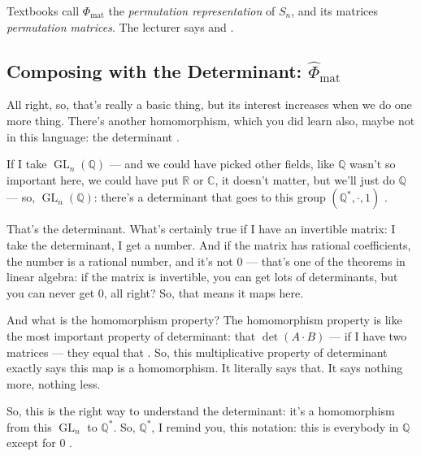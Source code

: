 \begin{aiNote}
Textbooks call $\Phi_{\mathrm{mat}}$ the \emph{permutation representation} of $S_n$, and its matrices \emph{permutation matrices}. The lecturer says  and .
\end{aiNote}

\subsection{Composing with the Determinant: \texorpdfstring{$\hat{\Phi}_{\text{mat}}$}{Phi-hat\_mat}}

\begin{speech}[00:17:02 - 00:18:32]
All right, so, that's really a basic thing, but its interest increases when we do one more thing. There's another homomorphism, which you did learn also, maybe not in this language: the determinant .

If I take $\operatorname{GL}_n(\mathbb{Q})$ --- and we could have picked other fields, like $\mathbb{Q}$ wasn't so important here, we could have put $\mathbb{R}$ or $\mathbb{C}$, it doesn't matter, but we'll just do $\mathbb{Q}$ --- so, $\operatorname{GL}_n(\mathbb{Q})$: there's a determinant that goes to this group $(\mathbb{Q}^*, \cdot, 1)$ .

That's the determinant. What's certainly true if I have an invertible matrix: I take the determinant, I get a number. And if the matrix has rational coefficients, the number is a rational number, and it's not $0$ --- that's one of the theorems in linear algebra: if the matrix is invertible, you can get lots of determinants, but you can never get $0$, all right? So, that means it maps here.

And what is the homomorphism property? The homomorphism property is like the most important property of determinant: that $\det(A \cdot B)$ --- if I have two matrices --- they equal that . So, this multiplicative property of determinant exactly says this map is a homomorphism. It literally says that. It says nothing more, nothing less.

So, this is the right way to understand the determinant: it's a homomorphism from this $\operatorname{GL}_n$ to $\mathbb{Q}^*$. So, $\mathbb{Q}^*$, I remind you, this notation: this is everybody in $\mathbb{Q}$ except for $0$ .
\end{speech}

